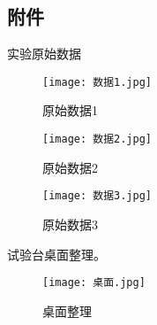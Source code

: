 \documentclass[dvipsnames, svgnames,a4paper,11pt]{article}
\begin{document}
	
	
	\subsection{附件}
	实验原始数据
	\begin{figure}[H]
		\begin{minipage}[b]{0.3\linewidth}
		  \centering
		  \texttt{[image: 数据1.jpg]}
		  \caption{原始数据1}
		\end{minipage}
		\hfill
		\begin{minipage}[b]{0.3\linewidth}
		  \centering
		  \texttt{[image: 数据2.jpg]}
		  \caption{原始数据2}
		\end{minipage}
		\hfill
		\begin{minipage}[b]{0.3\linewidth}
		  \centering
		  \texttt{[image: 数据3.jpg]}
		  \caption{原始数据3}
		\end{minipage}
	\end{figure}
	试验台桌面整理。
	\begin{figure}[{H}]
		\centering
		\texttt{[image: 桌面.jpg]}
		\caption{桌面整理}
		\label{}
	\end{figure}
	

	
	
	
	
\end{document}
